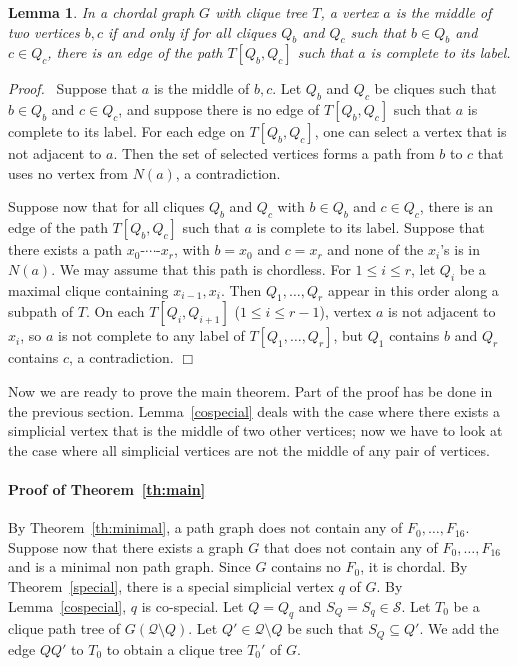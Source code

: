 \documentclass[11pt]{article}
\newtheorem{lemma}{Lemma}
\newenvironment{proof}{\noindent \emph{Proof.}\ }{\hfill
    $\Box$\vspace{1em}}
\begin{document}
\begin{lemma}
    \label{lem:middle}
In a chordal graph $G$ with clique tree $T$, a vertex $a$ is the
middle of two vertices $b, c$ if and only if for all cliques $Q_b$ and
$Q_c$ such that $b\in Q_b$ and $c\in Q_c$, there is an edge of the
path $T[Q_b, Q_c]$ such that $a$ is complete to its label.
\end{lemma}

\begin{proof}
Suppose that $a$ is the middle of $b, c$.  Let $Q_b$ and $Q_c$ be
cliques such that $b\in Q_b$ and $c\in Q_c$, and suppose there is no
edge of $T[Q_b, Q_c]$ such that $a$ is complete to its label.  For
each edge on $T[Q_b, Q_c]$, one can select a vertex that is not
adjacent to $a$.  Then the set of selected vertices forms a path from
$b$ to $c$ that uses no vertex from $N(a)$, a contradiction.

Suppose now that for all cliques $Q_b$ and $Q_c$ with $b\in Q_b$ and
$c\in Q_c$, there is an edge of the path $T[Q_b, Q_c]$ such that $a$
is complete to its label.  Suppose that there exists a path
$x_0$-$\cdots$-$x_r$, with $b=x_0$ and $c=x_r$ and none of the $x_i$'s
is in $N(a)$.  We may assume that this path is chordless.  For $1 \leq
i \leq r$, let $Q_i$ be a maximal clique containing $x_{i-1}, x_i$.
Then $Q_1, \ldots, Q_r$ appear in this order along a subpath of $T$.
On each $T[Q_i, Q_{i+1}]$ ($1\leq i\leq r-1$), vertex $a$ is not
adjacent to $x_i$, so $a$ is not complete to any label of $T[Q_1,
\ldots, Q_r]$, but $Q_1$ contains $b$ and $Q_r$ contains $c$, a
contradiction.
\end{proof}

Now we are ready to prove the main theorem.  Part of the proof has be
done in the previous section.  Lemma~\ref{cospecial} deals with the
case where there exists a simplicial vertex that is the middle of two
other vertices; now we have to look at the case where all simplicial
vertices are not the middle of any pair of vertices.

\paragraph*{Proof of Theorem~\ref{th:main}}
\setcounter{claim}{0}

By Theorem~\ref{th:minimal}, a path graph does not contain any of
$F_0, \ldots, F_{16}$.  Suppose now that there exists a graph $G$ that
does not contain any of $F_0, \ldots, F_{16}$ and is a minimal non
path graph.  Since $G$ contains no $F_0$, it is chordal.  By
Theorem~\ref{special}, there is a special simplicial vertex $q$ of
$G$.  By Lemma~\ref{cospecial}, $q$ is co-special.  Let $Q=Q_q$ and
$S_Q=S_q\in \mathcal S$.  Let $T_0$ be a clique path tree of
$G(\mathcal Q\setminus Q)$.  Let $Q'\in \mathcal Q\setminus Q$ be such
that $S_Q\subseteq Q'$.  We add the edge $QQ'$ to $T_0$ to obtain a
clique tree $T_0'$ of $G$.
\end{document}

